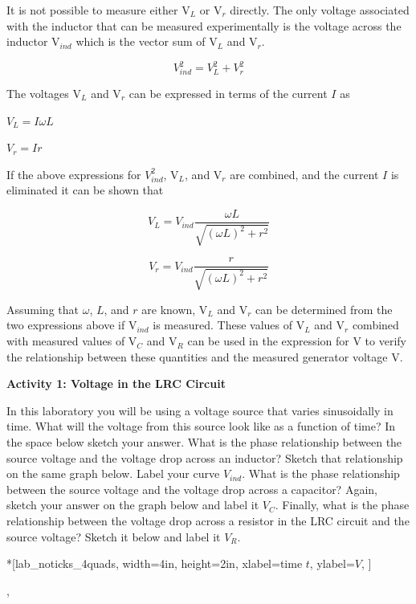 It is not possible to measure either V\( _{L} \) or V\( _{r} \)
directly. The only voltage associated with the inductor that can be
measured experimentally is the voltage across the inductor V\( _{ind} \)
which is the vector sum of V\( _{L} \) and V\( _{r} \).

\[
V_{ind}^{2}=V_{L}^{2}+V_{r}^{2}\]


The voltages V\( _{L} \) and V\( _{r} \) can be expressed in terms
of the current $I$ as

{\centering \( V_{L}=I\omega L \) \par}

{\centering \( V_{r}=Ir \)\par}

If the above expressions for \( V_{ind}^{2} \), V\( _{L} \), and
V\( _{r} \) are combined, and the current $I$ is eliminated it can
be shown that

\[
V_{L}=V_{ind}\frac{\omega L}{\sqrt{(\omega L)^{2}+r^{2}}}\]


\[
V_{r}=V_{ind}\frac{r}{\sqrt{(\omega L)^{2}+r^{2}}}\]


Assuming that \( \omega  \), $L$, and $r$ are known, V\( _{L} \) and
V\( _{r} \) can be determined from the two expressions above if V\( _{ind} \)
is measured. These values of V\( _{L} \) and V\( _{r} \) combined
with measured values of V\( _{C} \) and V\( _{R} \) can be used
in the expression for V to verify the relationship between these quantities
and the measured generator voltage V.

\textbf{Activity 1: Voltage in the LRC Circuit }

In this laboratory you will be using a voltage source that varies
sinusoidally in time.
What will the voltage from this source look like as a function
of time?
In the space below sketch your answer.
What is the phase relationship between the source voltage and the
voltage drop across an inductor?
Sketch that relationship on the same graph below.
Label your curve $V_{ind}$.
What is the phase relationship between the source voltage and the voltage
drop across a capacitor?
Again, sketch your answer on the graph below and label it $V_C$.
Finally, what is the phase relationship between the voltage drop
across a resistor in the LRC circuit and the source voltage?
Sketch it below and label it $V_R$.

\begin{lab_axis}*[lab_noticks_4quads,
	width=4in, height=2in,
	xlabel=time $t$,
	ylabel=$V$,
]
\end{lab_axis},


